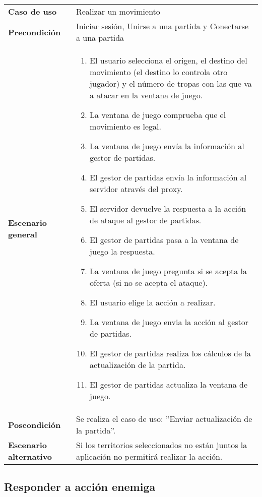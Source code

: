 {\footnotesize
\begin{tabularx}{0.95\textwidth}{p{}|X}

\textbf{Caso de uso} & Realizar un movimiento \\

\textbf{Precondición} & Iniciar sesión, Unirse a una partida y Conectarse a una
partida \\

\textbf{Escenario general} & \begin{enumerate}
\item El usuario selecciona el origen, el destino del movimiento (el destino
lo controla otro jugador) y el número de tropas con las que va a atacar en la
ventana de juego.
\item La ventana de juego comprueba que el movimiento es legal.
\item La ventana de juego envía la información al gestor de partidas.
\item El gestor de partidas envía la información al servidor através del proxy.
\item El servidor devuelve la respuesta a la acción de ataque al gestor de
partidas.
\item El gestor de partidas pasa a la ventana de juego la respuesta.
\item La ventana de juego pregunta si se acepta la oferta (si no se acepta
el ataque).
\item El usuario elige la acción a realizar.
\item La ventana de juego envia la acción al gestor de partidas.
\item El gestor de partidas realiza los cálculos de la actualización de la
partida.
\item El gestor de partidas actualiza la ventana de juego.
\end{enumerate} \\

\textbf{Poscondición} & Se realiza el caso de uso: ''Enviar actualización de la
partida''.\\

\textbf{Escenario alternativo} & Si los territorios seleccionados no están
juntos la aplicación no permitirá realizar la acción.

\end{tabularx}
}

\subsection{Responder a acción enemiga}

